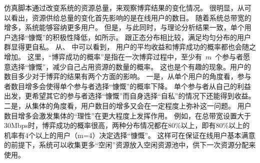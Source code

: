 仿真脚本通过改变系统的资源总量，来观察博弈结果的变化情况。
很明显，从可以看出，资源供给总量的变化首先影响的是在线用户的数目。
随着系统总带宽的增多，系统能够容纳更多用户。
但是，与此同时，与理论分析结果一致，单个用户选择“慷慨”的积极性降低，如所示。
跟正态分布相比较，满足均匀分布的用户群显得更自私。
从、
中可以看到，
用户的平均收益和博弈成功的概率都也会随之增加。
这里，“博弈成功的概率”是指在一次博弈过程中，至少有~$m$~个参与者愿意选择“慷慨”，减少自己占用资源的数量的概率。
这也是个有趣的现象。用户的数目多少对于博弈的结果有两个方面的影响。
一是，从单个用户的角度看，参与者数目增多会使得单个参与者选择“慷慨”的概率下降。
单个参与者从自己的利益出发，更希望其它的参与者选择“慷慨”而自身选择“自私”的情况下还能得到收益。
二是，从集体的角度看，用户数目的增多又会在一定程度上弥补这一问题。
用户数目增多会激发集体的“理性”在更大程度上发挥作用。
例如，在总带宽设置大于30Mbps时，博弈成功的概率很高，两种分布情况都在$80\%$以上，即有$80\%$以上的机率有4个以上的用户（m=4）决定选择“慷慨”。
这样可在保证在线用户基本满意的前提下，系统可以收集更多“空闲”资源放入空闲资源池中，供下一次资源分配来使用。
